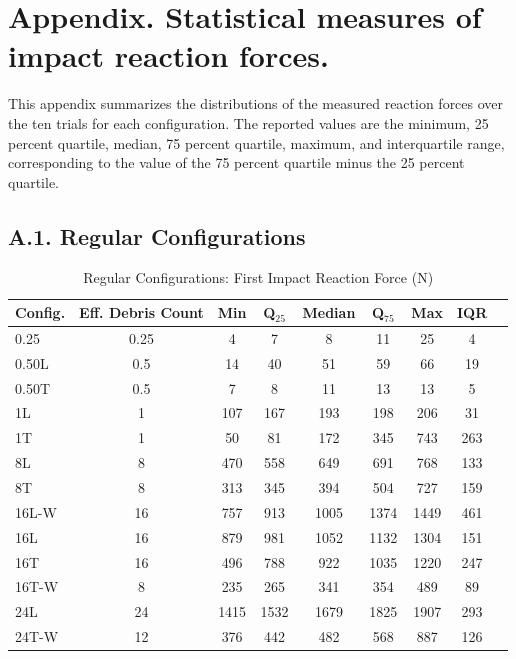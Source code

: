 \documentclass[10pt,a4paper]{article}
\begin{document}
  



\section{Appendix. Statistical measures of impact reaction forces.}
This appendix summarizes the distributions of the measured reaction forces over the ten trials for each configuration. The reported values are the minimum, 25 percent quartile, median, 75 percent quartile, maximum, and interquartile range, corresponding to the value of the 75 percent quartile minus the 25 percent quartile.

\subsection*{A.1. Regular Configurations}


\begin{table}[H]
\centering
\caption{Regular Configurations: First Impact Reaction Force (N)}
\label{tab:data-reg-FI} 
\begin{tabular}{lcccccccc}
\toprule
\textbf{Config.} & \textbf{Eff. Debris Count} & \textbf{Min} & \textbf{Q$_{25}$} & \textbf{Median} & \textbf{Q$_{75}$} & \textbf{Max} & \textbf{IQR} \\
\midrule
0.25  & 0.25 &4 & 7 & 8 & 11 & 25 & 4 \\
0.50L & 0.5 &14 & 40 & 51 & 59 & 66 & 19 \\
0.50T & 0.5 &7 & 8 & 11 & 13 & 13 & 5 \\ 
1L   & 1  & 107 & 167 & 193 & 198 & 206 & 31 \\
1T   & 1  & 50  & 81  & 172 & 345 & 743 & 263 \\
8L   & 8  & 470 & 558 & 649 & 691 & 768 & 133 \\
8T   & 8  & 313 & 345 & 394 & 504 & 727 & 159 \\
16L-W   & 16 & 757 & 913 & 1005 & 1374 & 1449 & 461 \\
16L & 16 & 879 & 981 & 1052 & 1132 & 1304 & 151 \\
16T   & 16 & 496 & 788 & 922 & 1035 & 1220 & 247 \\
16T-W & 8  & 235 & 265 & 341 & 354 & 489 & 89 \\
24L   & 24 & 1415 & 1532 & 1679 & 1825 & 1907 & 293 \\
24T-W & 12 & 376 & 442 & 482 & 568 & 887 & 126 \\
\bottomrule
\end{tabular}
\end{table}
\end{document}
